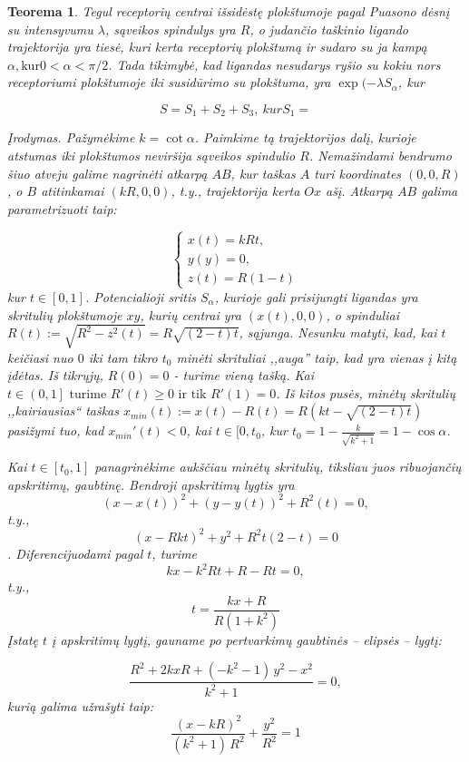 \documentclass[10pt]{article}
\newtheorem{thm}{Teorema}
\begin{document}
\begin{thm}\label{thm:3}
Tegul receptorių centrai išsidėstę plokštumoje  pagal Puasono dėsnį su intensyvumu $\lambda$,  sąveikos spindulys yra $R$, o judančio taškinio ligando trajektorija yra  tiesė, kuri kerta receptorių plokštumą ir sudaro su ja kampą $\alpha, \mbox{kur} 0 < \alpha < \pi/2 $. Tada  tikimybė, kad ligandas nesudarys ryšio su kokiu nors receptoriumi plokštumoje iki susidūrimo su plokštuma, yra $ \exp( -\lambda S_{\alpha} $, kur 

\[
S = S_1 + S_2 + S_3,\
kur S_1 = 
\]

Įrodymas. Pažymėkime $ k = \cot \alpha $. Paimkime tą trajektorijos dalį, kurioje atstumas iki plokštumos neviršija sąveikos spindulio  $ R $. Nemažindami bendrumo šiuo atveju galime nagrinėti atkarpą $ AB $, kur taškas $ A $ turi koordinates $ (0,0,R) $, o $ B $ atitinkamai  $ (kR,0,0) $, t.y., trajektorija kerta $ Ox $ ašį. Atkarpą  $ AB $ galima parametrizuoti taip:

\[
\begin{cases}
x(t) = kRt, \\
y(y) = 0, \\
z(t) = R(1-t)
\end{cases}
\]
kur $ t \in [0,1] $. Potencialioji sritis $ S_{\alpha} $, kurioje gali prisijungti ligandas yra skritulių plokštumoje $ xy $, kurių centrai yra $ (x(t),0,0)$, o spinduliai $ R(t):=\sqrt{R^2-z^2(t)}=R\sqrt{(2-t)t} $, sąjunga.
Nesunku matyti, kad, kai $ t $ keičiasi nuo $ 0 $ iki tam tikro $ t_0 $ minėti skrituliai ,,auga'' taip, kad yra vienas į kitą įdėtas. 
Iš tikrųjų, $ R(0)=0 $ - turime vieną tašką. Kai $ t \in \left( 0,1 \right] \mbox{ turime } R'(t) \geq 0 \mbox{ ir tik } R'(1)=0 $. Iš kitos pusės, minėtų skritulių ,,kairiausias`` taškas $ x_{min}(t) := x(t) - R(t) = R(kt-\sqrt{(2-t)t}) $ pasižymi tuo, kad $ x_{min}'(t) < 0 $, kai $ t \in [0, t_{0} $, kur 
$ t_{0} = 1 - \frac{k}{\sqrt{k^2+1}} = 1 - \cos \alpha  $.

Kai $ t \in [t_{0}, 1] $ panagrinėkime aukščiau minėtų skritulių, tiksliau juos ribuojančių apskritimų, gaubtinę. Bendroji apskritimų lygtis yra
$$ (x-x(t))^2 + (y-y(t))^2 + R^2(t) = 0, $$ 
t.y.,
$$ (x-Rkt)^2 + y^2 + R^2t(2-t) = 0 $$. 
Diferencijuodami pagal $ t $, turime 
$$ kx-k^2Rt+R-Rt = 0,  $$
t.y.,
$$
	t=\frac{kx+R}{R(1+k^2)}
$$
Įstatę $ t $ į apskritimų lygtį, gauname po pertvarkimų gaubtinės -- elipsės -- lygtį:

\[\frac{{R}^{2}+2kxR+\left( -{k}^{2}-1\right) \,{y}^{2}-{x}^{2}}{{k}^{2}+1}=0, \]
kurią galima užrašyti taip:
\[\frac{{\left( x-kR\right) }^{2}}{\left( {k}^{2}+1\right) \,{R}^{2}}+\frac{{y}^{2}}{{R}^{2}}=1\]





\end{thm}
\end{document}

